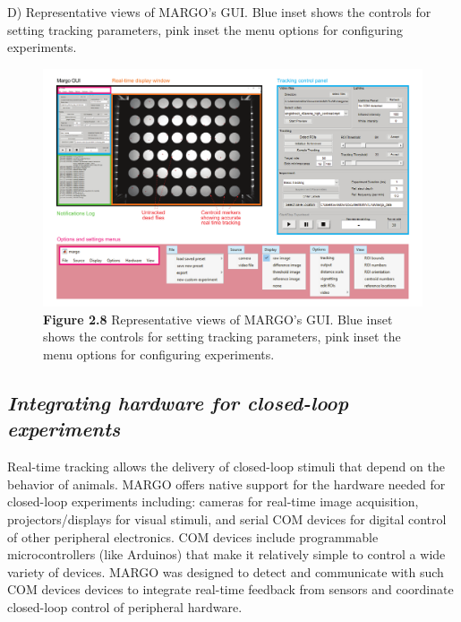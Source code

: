 \documentclass[12pt,letterpaper]{article}
\begin{document}
D) Representative views of MARGO's GUI. Blue inset shows the controls for setting tracking parameters, pink inset the menu options for configuring experiments.

\begin{figure}[t!]
    \includegraphics[width=\textwidth]{../figures/chapter_2/fig_2-8.pdf}
    \vspace{.1in}
    \caption*{\textbf{Figure 2.8} Representative views of MARGO's GUI. Blue inset shows the controls for setting tracking parameters, pink inset the menu options for configuring experiments.}
\end{figure}

\subsection*{\textit{Integrating hardware for closed-loop experiments}}

Real-time tracking allows the delivery of closed-loop stimuli that depend on the behavior of animals. MARGO offers native support for the hardware needed for closed-loop experiments including: cameras for real-time image acquisition, projectors/displays for visual stimuli, and serial COM devices for digital control of other peripheral electronics. COM devices include programmable microcontrollers (like Arduinos) that make it relatively simple to control a wide variety of devices. MARGO was designed to detect and communicate with such COM devices devices to integrate real-time feedback from sensors and coordinate closed-loop control of peripheral hardware. 
\end{document}

